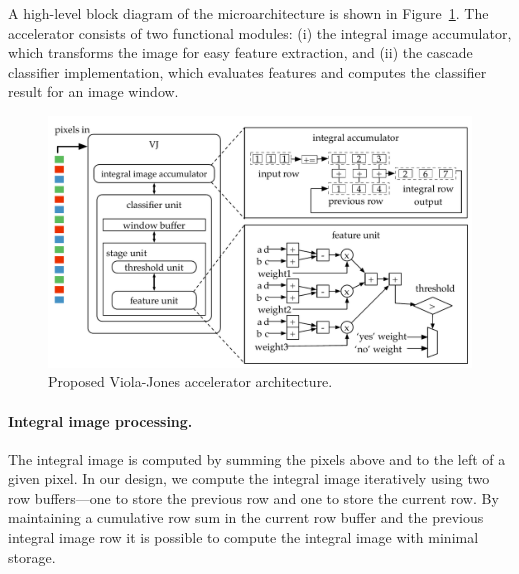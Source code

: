 A high-level block diagram of the microarchitecture is shown in Figure~\ref{fig:vj-block}. The accelerator consists of two functional modules: (i) the integral image accumulator, which transforms the image for easy feature extraction, and (ii) the cascade classifier implementation, which evaluates features and computes the classifier result for an image window.

\begin{figure}
      \includegraphics[width=\textwidth]{nsp-figs/vj_arch.pdf}
    \caption{Proposed Viola-Jones accelerator architecture.}

    \label{fig:vj-block}
\end{figure}

%
\paragraph{Integral image processing.} The integral image is computed by summing the pixels above and to the left of
a given pixel. In our design, we
compute the integral image iteratively using two row buffers---one to store the
previous row and one to store the current row. By maintaining
a cumulative row sum in the current row buffer and the previous integral image row
it is possible to compute the integral image with minimal storage.




